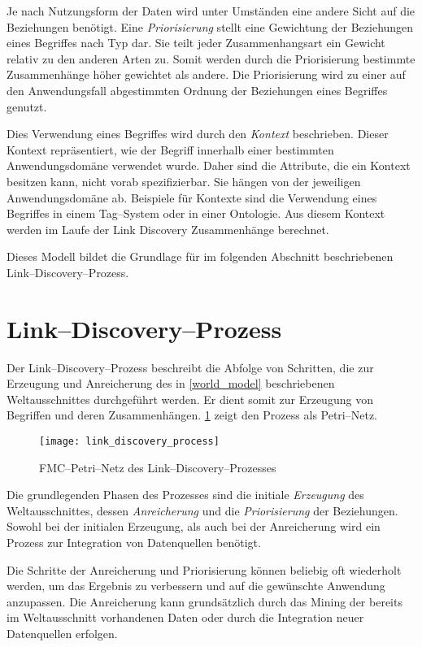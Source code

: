 Je nach Nutzungsform der Daten wird unter Umständen eine andere Sicht auf die Beziehungen benötigt. Eine \emph{Priorisierung} stellt eine Gewichtung der Beziehungen eines Begriffes nach Typ dar. Sie teilt jeder Zusammenhangsart ein Gewicht relativ zu den anderen Arten zu. Somit werden durch die Priorisierung bestimmte Zusammenhänge höher gewichtet als andere. Die Priorisierung wird zu einer auf den Anwendungsfall abgestimmten Ordnung der Beziehungen eines Begriffes genutzt.

Dies Verwendung eines Begriffes wird durch den \emph{Kontext} beschrieben. Dieser Kontext repräsentiert, wie der Begriff innerhalb einer bestimmten Anwendungsdomäne verwendet wurde. Daher sind die Attribute, die ein Kontext besitzen kann, nicht vorab spezifizierbar. Sie hängen von der jeweiligen Anwendungsdomäne ab. Beispiele für Kontexte sind die Verwendung eines Begriffes in einem Tag--System oder in einer Ontologie. Aus diesem Kontext werden im Laufe der Link Discovery Zusammenhänge berechnet.

Dieses Modell bildet die Grundlage für  im folgenden Abschnitt beschriebenen Link--Discovery--Prozess.

\section{Link--Discovery--Prozess}
\label{ld_process}

Der Link--Discovery--Prozess beschreibt die Abfolge von Schritten, die zur Erzeugung und Anreicherung des in \cref{world_model} beschriebenen Weltausschnittes durchgeführt werden. Er dient somit zur Erzeugung von Begriffen und deren Zusammenhängen. \cref{fig:link_discovery_process} zeigt den Prozess als Petri--Netz.

\begin{figure}
\centering
\texttt{[image: link\_discovery\_process]}
\caption{FMC--Petri--Netz des Link--Discovery--Prozesses}
\label{fig:link_discovery_process}
\end{figure}

Die grundlegenden Phasen des Prozesses sind die initiale \emph{Erzeugung} des Weltausschnittes, dessen \emph{Anreicherung} und die \emph{Priorisierung} der Beziehungen. Sowohl bei der initialen Erzeugung, als auch bei der Anreicherung wird ein Prozess zur Integration von Datenquellen benötigt.

Die Schritte der Anreicherung und Priorisierung können beliebig oft wiederholt werden, um das Ergebnis zu verbessern und auf die gewünschte Anwendung anzupassen. Die Anreicherung kann grundsätzlich durch das Mining der bereits im Weltausschnitt vorhandenen Daten oder durch die Integration neuer Datenquellen erfolgen.

